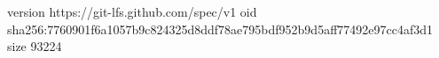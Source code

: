 version https://git-lfs.github.com/spec/v1
oid sha256:7760901f6a1057b9c824325d8ddf78ae795bdf952b9d5aff77492e97cc4af3d1
size 93224
